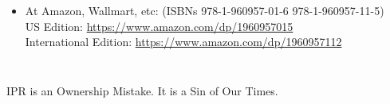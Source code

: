 \begin{frame}[fragile,plain,label=rejectingIpr]
\begin{small}
\begin{columns}[T]
    \begin{itemize}
      \item At Amazon, Wallmart, etc: (ISBNs 978-1-960957-01-6  978-1-960957-11-5)\\
      US Edition:   \url{https://www.amazon.com/dp/1960957015}\\
      International Edition: \url{https://www.amazon.com/dp/1960957112}\\

    \end{itemize}

\end{columns}
\end{small}

\begin{exampleblock}{IPR is an Ownership Mistake. It is a Sin of Our Times.}
\end{exampleblock}






\end{frame}
